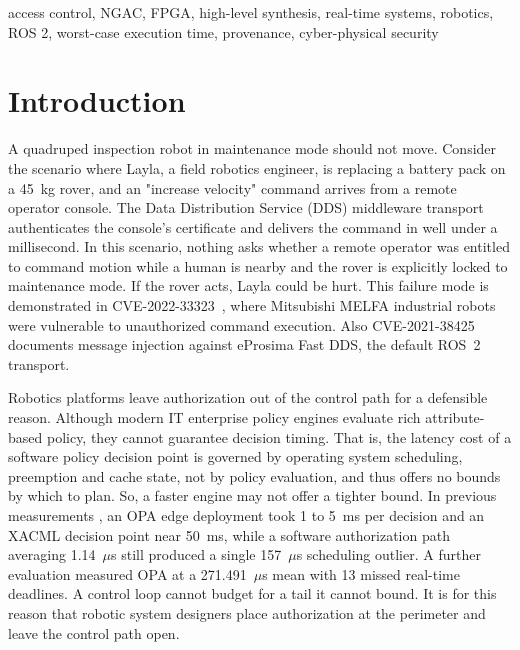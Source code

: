 \documentclass[conference]{IEEEtran}
\begin{document}
\begin{IEEEkeywords}
access control, NGAC, FPGA, high-level synthesis, real-time systems, robotics, ROS 2, worst-case execution time, provenance, cyber-physical security
\end{IEEEkeywords}

\section{Introduction}
\label{sec:intro}

A quadruped inspection robot in maintenance mode should not move. Consider the scenario where Layla, a field robotics engineer, is replacing a battery pack on a 45~kg rover, and an "increase velocity" command arrives from a remote operator console. The Data Distribution Service (DDS) middleware transport authenticates the console's certificate and delivers the command in well under a millisecond. In this scenario, nothing asks whether a remote operator was entitled to command motion while a human is nearby and the rover is explicitly locked to maintenance mode. If the rover acts, Layla could be hurt. This failure mode is demonstrated in CVE-2022-33323~\cite{cve202233323}, where Mitsubishi MELFA industrial robots were vulnerable to unauthorized command execution. Also CVE-2021-38425~\cite{cve202138425} documents message injection against eProsima Fast DDS, the default ROS~2 transport.



Robotics platforms leave authorization out of the control path for a defensible reason. Although modern IT enterprise policy engines evaluate rich attribute-based policy, they cannot guarantee decision timing. That is, the latency cost of a software policy decision point is governed by operating system scheduling, preemption and cache state, not by policy evaluation, and thus offers no bounds by which to plan. So, a faster engine may not offer a tighter bound. In previous measurements \cite{karim2026dcas}, an OPA edge deployment took 1 to 5~ms per decision and an XACML decision point near 50~ms, while a software authorization path averaging 1.14~$\mu$s still produced a single 157~$\mu$s scheduling outlier. A further evaluation \cite{karim2026tsngac} measured OPA at a 271.491~$\mu$s mean with 13 missed real-time deadlines. A control loop cannot budget for a tail it cannot bound. It is for this reason that robotic system designers place authorization at the perimeter and leave the control path open.
\end{document}
